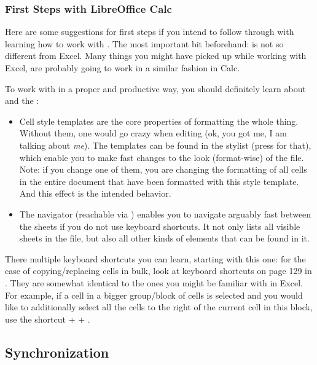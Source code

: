 \subsubsection{First Steps with LibreOffice Calc}
\label{subsubsec:first-steps-with-libreoffice-calc}

Here are some suggestions for first steps if you intend to follow through with learning how to work with \loc.
The most important bit beforehand: \loc is not so different from Excel.
Many things you might have picked up while working with Excel, are probably going to work in a similar fashion in Calc.

To work with \tfn in a proper and productive way, you should definitely learn about  and the :
\begin{itemize}
	\item Cell style templates are the core properties of formatting the whole thing.
	Without them, one would go crazy when editing \tfn (ok, you got me, I am talking about \emph{me}).
	The templates can be found in the stylist (press  for that), which enable you to make fast changes to the look (format-wise) of the file.
	Note: if you change one of them, you are changing the formatting of all cells in the entire document that have been formatted with this style template.
	And this effect is the intended behavior.
	\item The navigator (reachable via ) enables you to navigate arguably fast between the sheets if you do not use keyboard shortcuts.
	It not only lists all visible sheets in the file, but also all other kinds of elements that can be found in it.
\end{itemize}

There multiple keyboard shortcuts you can learn, starting with this one:
for the case of copying/replacing cells in bulk, look at keyboard shortcuts on page 129 in .
They are somewhat identical to the ones you might be familiar with in Excel.
For example, if a cell in a bigger group/block of cells is selected and you would like to additionally select all the cells to the right of the current cell in this block, use the shortcut  +  + \keystroke{\( \rightarrow \)}.

\subsection{Synchronization}
\label{subsec:synchronization}

